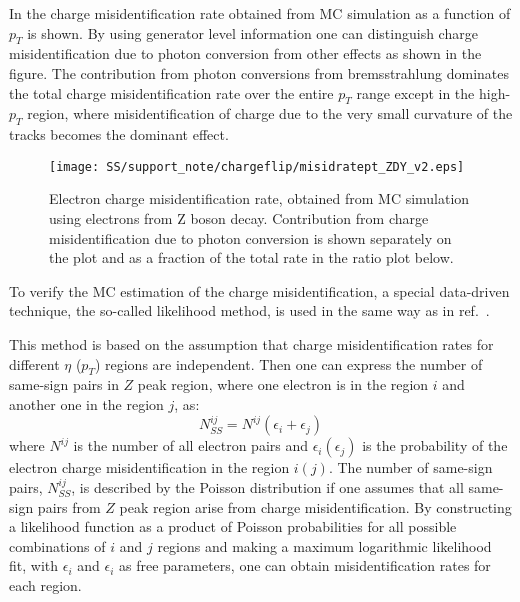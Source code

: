 In  the charge misidentification rate obtained from MC simulation as a function of $p_T$ is shown.
By using generator level information one can distinguish charge misidentification due to photon conversion from other effects as shown in the figure.
The contribution from photon conversions from bremsstrahlung dominates 
the total charge misidentification rate over the entire $p_T$ range except in the high-$p_T$ region, where misidentification 
of charge due to the very small curvature of the tracks becomes the dominant effect.

\begin{figure}
\begin{center}
 \texttt{[image: SS/support\_note/chargeflip/misidratept\_ZDY\_v2.eps]}
\caption{Electron charge misidentification rate, obtained from MC simulation using electrons from Z boson decay. 
Contribution from charge misidentification due to photon conversion is shown separately on the plot and as a fraction of the total rate in the ratio plot below.}
\label{fig:chargeFlip_structure}
\end{center}
\end{figure}

To verify the MC estimation of the charge misidentification, a special data-driven technique, the so-called likelihood method, 
is used in the same way as in ref.~\cite{same_sign_paper_7tev}.


This method is based on the assumption that charge misidentification rates for different $\eta$ ($p_T$) regions are independent.
Then one can express the number of same-sign pairs in $Z$ peak region, where one electron is in the region $i$ and another one in the region $j$, as:
\begin{equation}
 N_{SS}^{ij} = N^{ij}(\epsilon_i+\epsilon_j)
\end{equation}
where $N^{ij}$ is the number of all electron pairs and $\epsilon_i (\epsilon_j)$ is the probability of the electron charge misidentification in the region $i (j)$. The number of same-sign pairs, $N_{SS}^{ij}$, is described by the Poisson distribution if one assumes that all same-sign pairs from $Z$ peak region arise from charge misidentification. 
By constructing a likelihood function as a product of Poisson probabilities for all possible combinations of $i$ and $j$ regions and making a maximum logarithmic likelihood fit, with $\epsilon_i$ and $\epsilon_i$ as free parameters, one can obtain misidentification rates for each region.

